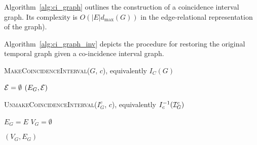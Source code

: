 Algorithm~\ref{alg:ci_graph} outlines the construction of a coincidence interval
graph. Its complexity is $O(|E|d_{\max}(G))$ in the edge-relational
representation of the graph).

Algorithm~\ref{alg:ci_graph_inv} depicts the procedure for restoring the
original temporal graph given a co-incidence interval graph.

\begin{algorithm}
  \label{alg:ci_graph}
  \caption{\textsc{MakeCoincidenceInterval($G$, $c$)}, equivalently $I_C(G)$}
  \SetAlgoLined

  $\mathcal{E} = \emptyset$\;
  \Return $(E_G, \mathcal{E})$\;
\end{algorithm}

\begin{algorithm}
  \label{alg:ci_graph_inv}
  \caption{\textsc{UnmakeCoincidenceInterval($I_G^c$, $c$)}, equivalently $I_c^{-1}(\mathcal{I}_G^c)$ }
  $E_G = E$\;
   $V_G = \emptyset$\;
  
  \Return $(V_G,E_G)$\;
\end{algorithm}


